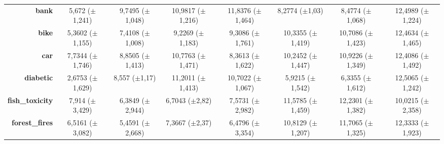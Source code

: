 \documentclass[preprint,review,12pt]{elsarticle}
\begin{document}
\begin{table}[!tb]
{\begin{tabular}{r|c|c|ccccc|}
			\textbf{bank}                 & \cellcolor[rgb]{ .914,  .894,  .51}5,672 ($\pm$1,241)                             & \cellcolor[rgb]{ .988,  .639,  .463}9,7495 ($\pm$1,048) & \cellcolor[rgb]{ .98,  .537,  .447}10,9817 ($\pm$1,216)  & \cellcolor[rgb]{ .976,  .467,  .431}11,8376 ($\pm$1,464) & \cellcolor[rgb]{ .992,  .757,  .486}8,2774 ($\pm$1,03)   & \cellcolor[rgb]{ .992,  .741,  .486}8,4774 ($\pm$1,068)  & \cellcolor[rgb]{ .973,  .412,  .42}12,4989 ($\pm$1,224)  \\
			\textbf{bike}                 & \cellcolor[rgb]{ .859,  .878,  .506}5,3602 ($\pm$1,155)                           & \cellcolor[rgb]{ .996,  .843,  .506}7,4108 ($\pm$1,008) & \cellcolor[rgb]{ .988,  .686,  .475}9,2269 ($\pm$1,183)  & \cellcolor[rgb]{ .988,  .682,  .475}9,3086 ($\pm$1,761)  & \cellcolor[rgb]{ .984,  .596,  .455}10,3355 ($\pm$1,419) & \cellcolor[rgb]{ .984,  .561,  .451}10,7086 ($\pm$1,423) & \cellcolor[rgb]{ .973,  .412,  .42}12,4634 ($\pm$1,465)  \\
			\textbf{car}                  & \cellcolor[rgb]{ 1,  .922,  .518}7,7344 ($\pm$1,746)                              & \cellcolor[rgb]{ .996,  .8,  .498}8,8505 ($\pm$1,413)   & \cellcolor[rgb]{ .984,  .592,  .455}10,7763 ($\pm$1,471) & \cellcolor[rgb]{ 1,  .855,  .506}8,3613 ($\pm$1,622)     & \cellcolor[rgb]{ .988,  .651,  .467}10,2452 ($\pm$1,447) & \cellcolor[rgb]{ .984,  .576,  .451}10,9226 ($\pm$1,349) & \cellcolor[rgb]{ .973,  .412,  .42}12,4086 ($\pm$1,492)  \\
			\textbf{diabetic}             & \cellcolor[rgb]{ .494,  .773,  .486}2,6753 ($\pm$1,629)                           & \cellcolor[rgb]{ .992,  .765,  .49}8,557 ($\pm$1,17)    & \cellcolor[rgb]{ .98,  .529,  .443}11,2011 ($\pm$1,413)  & \cellcolor[rgb]{ .984,  .573,  .451}10,7022 ($\pm$1,067) & \cellcolor[rgb]{ .898,  .89,  .51}5,9215 ($\pm$1,542)    & \cellcolor[rgb]{ .949,  .906,  .514}6,3355 ($\pm$1,612)  & \cellcolor[rgb]{ .973,  .412,  .42}12,5065 ($\pm$1,242)  \\
			\textbf{fish\_toxicity}       & \cellcolor[rgb]{ .996,  .788,  .494}7,914 ($\pm$3,429)                            & \cellcolor[rgb]{ 1,  .922,  .518}6,3849 ($\pm$2,944)    & \cellcolor[rgb]{ 1,  .894,  .514}6,7043 ($\pm$2,82)      & \cellcolor[rgb]{ .996,  .82,  .498}7,5731 ($\pm$2,982)   & \cellcolor[rgb]{ .976,  .471,  .431}11,5785 ($\pm$1,459) & \cellcolor[rgb]{ .973,  .412,  .42}12,2301 ($\pm$1,382)  & \cellcolor[rgb]{ .984,  .608,  .459}10,0215 ($\pm$2,358) \\
			\textbf{forest\_fires}        & \cellcolor[rgb]{ 1,  .859,  .506}6,5161 ($\pm$3,082)                              & \cellcolor[rgb]{ .898,  .89,  .51}5,4591 ($\pm$2,668)   & \cellcolor[rgb]{ .996,  .796,  .494}7,3667 ($\pm$2,37)   & \cellcolor[rgb]{ 1,  .863,  .51}6,4796 ($\pm$3,354)      & \cellcolor[rgb]{ .98,  .529,  .443}10,8129 ($\pm$1,207)  & \cellcolor[rgb]{ .976,  .463,  .431}11,7065 ($\pm$1,325) & \cellcolor[rgb]{ .973,  .412,  .42}12,3333 ($\pm$1,923)  \\

\end{tabular}}
\end{table}
\end{document}
